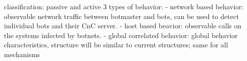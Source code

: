 classification: passive and active
3 types of behavior: 
- network based behavior: observable network traffic between botmaster and bots, can be used to detect individual bots and their CnC server. 
- host based beavior: observable calls on the systems infected by botnets. 
- global correlated behavior: global behavior characteristics, structure will be similar to current structures; same for all mechanisms

